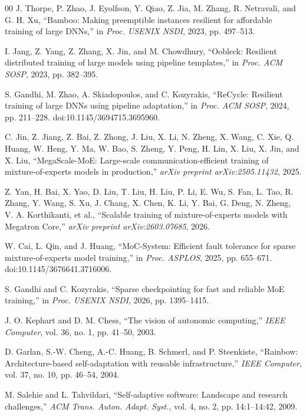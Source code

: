 \documentclass[10pt,conference]{IEEEtran}
\begin{document}
\begin{thebibliography}{00}
 J. Thorpe, P. Zhao, J. Eyolfson, Y. Qiao, Z. Jia, M. Zhang, R. Netravali, and G. H. Xu, ``Bamboo: Making preemptible instances resilient for affordable training of large DNNs,'' in \textit{Proc. USENIX NSDI}, 2023, pp. 497--513.

 I. Jang, Z. Yang, Z. Zhang, X. Jin, and M. Chowdhury, ``Oobleck: Resilient distributed training of large models using pipeline templates,'' in \textit{Proc. ACM SOSP}, 2023, pp. 382--395.

 S. Gandhi, M. Zhao, A. Skiadopoulos, and C. Kozyrakis, ``ReCycle: Resilient training of large DNNs using pipeline adaptation,'' in \textit{Proc. ACM SOSP}, 2024, pp. 211--228. doi:10.1145/3694715.3695960.

 C. Jin, Z. Jiang, Z. Bai, Z. Zhong, J. Liu, X. Li, N. Zheng, X. Wang, C. Xie, Q. Huang, W. Heng, Y. Ma, W. Bao, S. Zheng, Y. Peng, H. Lin, X. Liu, X. Jin, and X. Liu, ``MegaScale-MoE: Large-scale communication-efficient training of mixture-of-experts models in production,'' \textit{arXiv preprint arXiv:2505.11432}, 2025.

 Z. Yan, H. Bai, X. Yao, D. Liu, T. Liu, H. Liu, P. Li, E. Wu, S. Fan, L. Tao, R. Zhang, Y. Wang, S. Xu, J. Chang, X. Chen, K. Li, Y. Bai, G. Deng, N. Zheng, V. A. Korthikanti, et al., ``Scalable training of mixture-of-experts models with Megatron Core,'' \textit{arXiv preprint arXiv:2603.07685}, 2026.

 W. Cai, L. Qin, and J. Huang, ``MoC-System: Efficient fault tolerance for sparse mixture-of-experts model training,'' in \textit{Proc. ASPLOS}, 2025, pp. 655--671. doi:10.1145/3676641.3716006.

 S. Gandhi and C. Kozyrakis, ``Sparse checkpointing for fast and reliable MoE training,'' in \textit{Proc. USENIX NSDI}, 2026, pp. 1395--1415.

 J. O. Kephart and D. M. Chess, ``The vision of autonomic computing,'' \textit{IEEE Computer}, vol. 36, no. 1, pp. 41--50, 2003.

 D. Garlan, S.-W. Cheng, A.-C. Huang, B. Schmerl, and P. Steenkiste, ``Rainbow: Architecture-based self-adaptation with reusable infrastructure,'' \textit{IEEE Computer}, vol. 37, no. 10, pp. 46--54, 2004.

 M. Salehie and L. Tahvildari, ``Self-adaptive software: Landscape and research challenges,'' \textit{ACM Trans. Auton. Adapt. Syst.}, vol. 4, no. 2, pp. 14:1--14:42, 2009.


\end{thebibliography}
\end{document}

